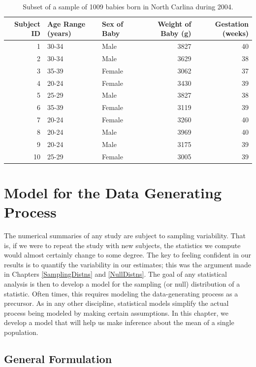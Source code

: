 \documentclass[
]{book}
\theoremstyle{plain}
\theoremstyle{mydefn}
\theoremstyle{myexmpl}
\theoremstyle{remark}
\begin{document}
\begin{table}

\caption{\label{tab:casebabies-table}Subset of a sample of 1009 babies born in North Carlina during 2004.}
\centering
\begin{tabular}[t]{r|l|l|r|r}
\hline
Subject ID & Age Range (years) & Sex of Baby & Weight of Baby (g) & Gestation (weeks)\\
\hline
1 & 30-34 & Male & 3827 & 40\\
\hline
2 & 30-34 & Male & 3629 & 38\\
\hline
3 & 35-39 & Female & 3062 & 37\\
\hline
4 & 20-24 & Female & 3430 & 39\\
\hline
5 & 25-29 & Male & 3827 & 38\\
\hline
6 & 35-39 & Female & 3119 & 39\\
\hline
7 & 20-24 & Female & 3260 & 40\\
\hline
8 & 20-24 & Male & 3969 & 40\\
\hline
9 & 20-24 & Male & 3175 & 39\\
\hline
10 & 25-29 & Female & 3005 & 39\\
\hline
\end{tabular}
\end{table}

\hypertarget{MeanModels}{%
\chapter{Model for the Data Generating Process}\label{MeanModels}}

The numerical summaries of any study are subject to sampling variability. That is, if we were to repeat the study with new subjects, the statistics we compute would almost certainly change to some degree. The key to feeling confident in our results is to quantify the variability in our estimates; this was the argument made in Chapters \ref{SamplingDistns} and \ref{NullDistns}. The goal of any statistical analysis is then to develop a model for the sampling (or null) distribution of a statistic. Often times, this requires modeling the data-generating process as a precursor. As in any other discipline, statistical models simplify the actual process being modeled by making certain assumptions. In this chapter, we develop a model that will help us make inference about the mean of a single population.

\hypertarget{general-formulation}{%
\section{General Formulation}\label{general-formulation}}
\end{document}
